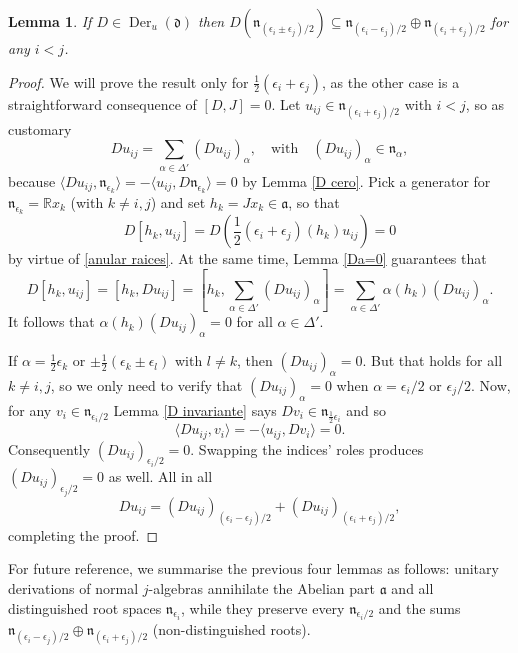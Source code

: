 \documentclass[12pt, twoside]{amsart}
\def\d{\mathfrak{d}}
\def\n{\mathfrak{n}}
\def\a{\mathfrak{a}}
\def\R{\mathbb{R}}
\newcommand{\op}[1]{\operatorname{#1}}
\newtheorem{lemma}[definition]{Lemma}
\theoremstyle{definition}
\begin{document}
\begin{lemma} \label{D suma}
If $D \in \op{Der}_{u}(\d)$ then   $D(\n_{(\epsilon_{i}\pm \epsilon_{j})/2})\subseteq \n_{(\epsilon_{i}-\epsilon_{j})/2}\oplus \n_{(\epsilon_{i}+\epsilon_{j})/2}$ for any $i<j$.
\end{lemma}
\begin{proof}
We will prove the result only for $\tfrac{1}{2} (\epsilon_i+\epsilon_j)$, as the other case is a straightforward consequence of $[D, J]=0$. 
Let $u_{ij} \in \n_{(\epsilon_{i}+\epsilon_{j})/2}$ with $i<j$, so as customary 
\[ Du_{ij}=\sum_{\alpha \in \Delta'}(Du_{ij})_{\alpha}, \quad \text{with} \quad (Du_{ij})_{\alpha}\in \n_\alpha, \]
because $\langle Du_{ij},\n_{\epsilon_k}\rangle=-\langle u_{ij},D\n_{\epsilon_k}\rangle=0$ by Lemma \ref{D cero}. Pick a generator for $\n_{\epsilon_k}=\R x_k$ (with $k \neq i,j$) and set $h_k=Jx_{k} \in \a$, so that 
\[D[h_k,u_{ij}]=D\left(\frac{1}{2}(\epsilon_{i}+\epsilon_{j})(h_k)u_{ij}\right)=0 \]
by virtue of \eqref{anular raices}. At the same time, Lemma \ref{Da=0} guarantees that 
\[ D[h_k,u_{ij}]= 
[h_k,Du_{ij}]=\left[h_k, \sum_{\alpha \in \Delta'} (Du_{ij})_{\alpha}\right]=\sum_{\alpha \in \Delta'}\alpha(h_k)(Du_{ij})_{\alpha}. \]
It follows that $\alpha(h_k)(Du_{ij})_{\alpha}=0$ for all $\alpha \in \Delta'$.

If $\alpha = \tfrac{1}{2} \epsilon_k$ or $\pm\tfrac{1}{2}(\epsilon_{k}\pm \epsilon_{l})$ with $l\neq k$, then $(Du_{ij})_{ \alpha}=0$. But that holds for all  $k\neq i,j$, so we only need to verify that $(Du_{ij})_{ \alpha}=0$ when $\alpha= \epsilon_i/2$ or $\epsilon_j/2$. 
Now, for any $v_{i} \in \n_{{\epsilon_i/2}}$ Lemma \ref{D invariante} says 
$Dv_i\in \n_{\frac12\epsilon_i}$ and so 
 \[ \langle Du_{ij},v_i \rangle=-\langle u_{ij},Dv_i \rangle =0.\] 
Consequently  $(Du_{ij})_{\epsilon_i/2}=0$. Swapping the indices' roles  produces $(Du_{ij})_{\epsilon_j/2}=0$ as well. All in all
\begin{equation*}
    Du_{ij}=(Du_{ij})_{(\epsilon_{i}-\epsilon_{j})/2} + (Du_{ij})_{(\epsilon_{i}+\epsilon_{j})/2},
\end{equation*}
completing the proof.
\end{proof}
For future reference, we summarise the previous four lemmas as follows: unitary derivations of normal $j$-algebras annihilate the Abelian part $\a$ and all distinguished root spaces $\n_{\epsilon_i}$, while they preserve every $\n_{\epsilon_i/2}$ and the sums $\n_{(\epsilon_{i}-\epsilon_{j})/2}\oplus \n_{(\epsilon_{i}+\epsilon_{j})/2}$ (non-distinguished roots).
\bigskip
\end{document}
